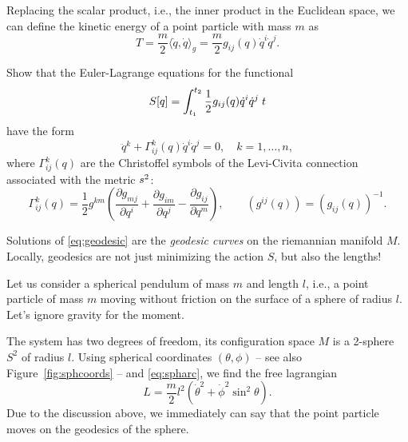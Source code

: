\documentclass[english,fontsize=11pt,paper=a5,oneside]{scrbook}
\newcommand{\lag}{\langle}
\newcommand{\rag}{\rangle}
\let\d\relax
\DeclareMathOperator{\d}{d}
\theoremstyle{definition}
\newenvironment{example}
  {\pushQED{\qed}\renewcommand{\qedsymbol}{$\lozenge$}\examplex}
  {\popQED\endexamplex}
\newenvironment{exercise}
  {\pushQED{\qed}\renewcommand{\qedsymbol}{$\maltese$}\exercisex}
  {\popQED\endexercisex}
\begin{document}
Replacing the scalar product, i.e., the inner product in the Euclidean space, we can define the kinetic energy of a point particle with mass $m$ as
\begin{equation}
    T = \frac m2 \lag\dot q, \dot q\rag_g = \frac{m}2 g_{ij}(q)\dot q^i\dot q^j.
\end{equation}

\begin{exercise}\label{exe:geodesic1}
    Show that the Euler-Lagrange equations for the functional
    \begin{equation}
        S[q] = \int_{t_1}^{t_2} \frac 12 g_{ij}(q) \dot q^i \dot q^j\; \d t
    \end{equation}
    have the form
    \begin{equation}\label{eq:geodesic}
        \ddot q^k + \Gamma_{ij}^k(q) \dot q^i \dot q^j = 0, \quad k=1,\ldots, n,
    \end{equation}
    where $\Gamma_{ij}^k(q)$ are the Christoffel symbols of the Levi-Civita connection associated with the metric $\d s^2$:
    \begin{equation}
        \Gamma_{ij}^k(q) = \frac12 g^{km}\left(
            \frac{\partial g_{mj}}{\partial q^i} + \frac{\partial g_{im}}{\partial q^j}-\frac{\partial g_{ij}}{\partial q^m}
            \right),
        \qquad (g^{ij}(q)) = (g_{ij}(q))^{-1}.
    \end{equation}
\end{exercise}

Solutions of \eqref{eq:geodesic} are the \emph{geodesic curves} on the riemannian manifold $M$. Locally, geodesics are not just minimizing the action $S$, but also the lengths!

\begin{example}\label{ex:sphericalP}
    Let us consider a spherical pendulum of mass $m$ and length $l$, i.e., a point particle of mass $m$ moving without friction on the surface of a sphere of radius $l$.
    Let's ignore gravity for the moment.
    
    The system has two degrees of freedom, its configuration space $M$ is a 2-sphere $S^2$ of radius $l$.
    Using spherical coordinates $(\theta, \phi)$ -- see also Figure~\ref{fig:sphcoords} -- and \eqref{eq:spharc}, we find the free lagrangian
    \begin{equation}\label{eq:LsphericalP}
        L = \frac m2 l^2(\dot \theta^2 + \dot \phi^2 \sin^2\theta).
    \end{equation}
    Due to the discussion above, we immediately can say that the point particle moves on the geodesics of the sphere.
\end{example}
\end{document}
